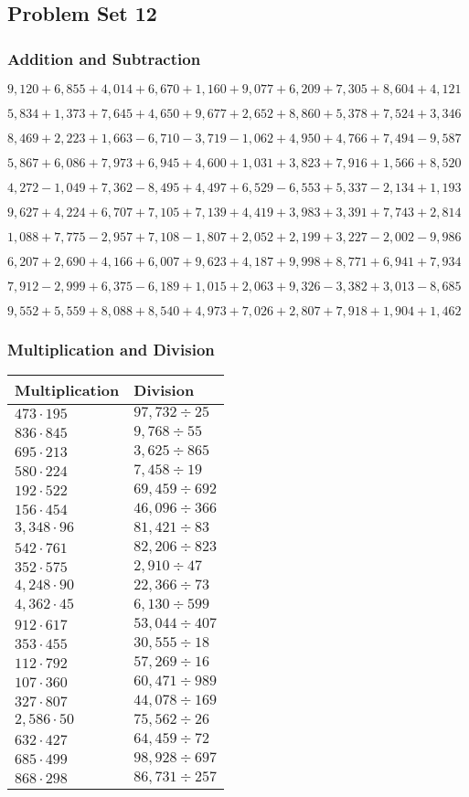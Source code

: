 \hypertarget{problem-set-12-3}{%
\subsection{Problem Set 12}\label{problem-set-12-3}}

\hypertarget{addition-and-subtraction-174}{%
\subsubsection{Addition and
Subtraction}\label{addition-and-subtraction-174}}

\(9,120+6,855+4,014+6,670+1,160+9,077+6,209+7,305+8,604+ 4,121\)

\(5,834+1,373+7,645+4,650+9,677+2,652+8,860+5,378+7,524+3,346\)

\(8,469+2,223+1,663-6,710-3,719-1,062+4,950+4,766+7,494-9,587\)

\(5,867+6,086+7,973+6,945+4,600+1,031+3,823+7,916+1,566+8,520\)

\(4,272-1,049+7,362-8,495+4,497+6,529-6,553+5,337-2,134+1,193\)

\(9,627+4,224+6,707+7,105+7,139+4,419+3,983+3,391+7,743+2,814\)

\(1,088+7,775-2,957+7,108-1,807+2,052+2,199+3,227-2,002-9,986\)

\(6,207+2,690+4,166+6,007+9,623+4,187+9,998+8,771+6,941+7,934\)

\(7,912-2,999+6,375-6,189+1,015+2,063+9,326-3,382+3,013-8,685\)

\(9,552+5,559+8,088+8,540+4,973+7,026+2,807+7,918+1,904+1,462\)

\hypertarget{multiplication-and-division-173}{%
\subsubsection{Multiplication and
Division}\label{multiplication-and-division-173}}

\begin{longtable}[]{@{}ll@{}}
\toprule
Multiplication & Division\tabularnewline
\midrule
\endhead
\(473\cdot195\) & \(97,732÷25\)\tabularnewline
\(836\cdot845\) & \(9,768÷55\)\tabularnewline
\(695\cdot213\) & \(3,625÷865\)\tabularnewline
\(580\cdot224\) & \(7,458÷19\)\tabularnewline
\(192\cdot522\) & \(69,459÷692\)\tabularnewline
\(156\cdot454\) & \(46,096÷366\)\tabularnewline
\(3,348\cdot96\) & \(81,421÷83\)\tabularnewline
\(542\cdot761\) & \(82,206÷823\)\tabularnewline
\(352\cdot575\) & \(2,910÷47\)\tabularnewline
\(4,248\cdot90\) & \(22,366÷73\)\tabularnewline
\(4,362\cdot45\) & \(6,130÷599\)\tabularnewline
\(912\cdot617\) & \(53,044÷407\)\tabularnewline
\(353\cdot455\) & \(30,555÷18\)\tabularnewline
\(112\cdot792\) & \(57,269÷16\)\tabularnewline
\(107\cdot360\) & \(60,471÷989\)\tabularnewline
\(327\cdot807\) & \(44,078÷169\)\tabularnewline
\(2,586\cdot50\) & \(75,562÷26\)\tabularnewline
\(632\cdot427\) & \(64,459÷72\)\tabularnewline
\(685\cdot499\) & \(98,928÷697\)\tabularnewline
\(868\cdot298\) & \(86,731÷257\)\tabularnewline
\bottomrule
\end{longtable}

